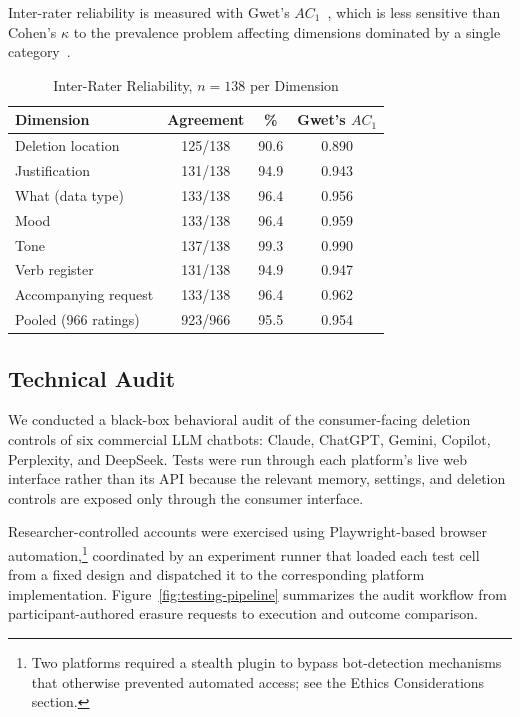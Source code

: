 \documentclass[conference,compsoc]{IEEEtran}
\begin{document}
Inter-rater reliability is measured with Gwet's $AC_1$~\cite{gwet2008ac1}, which is less sensitive than Cohen's $\kappa$ to the prevalence problem affecting dimensions dominated by a single category~\cite{gwet2008ac1,wongpakaran2013comparison}.

\begin{table}[t]
\centering
\caption{Inter-Rater Reliability, $n=138$ per Dimension}
\label{tab:ac1}
\small
\begin{tabular}{lccc}
\toprule
Dimension & Agreement & \% & Gwet's $AC_1$ \\
\midrule
Deletion location        & 125/138 & 90.6 & 0.890 \\
Justification            & 131/138 & 94.9 & 0.943 \\
What (data type)         & 133/138 & 96.4 & 0.956 \\
Mood                     & 133/138 & 96.4 & 0.959 \\
Tone                     & 137/138 & 99.3 & 0.990 \\
Verb register            & 131/138 & 94.9 & 0.947 \\
Accompanying request     & 133/138 & 96.4 & 0.962 \\
\midrule
Pooled (966 ratings) & 923/966 & 95.5 & 0.954 \\
\bottomrule
\end{tabular}
\end{table}

\subsection{Technical Audit}
\label{sec:audit-methodology}

We conducted a black-box behavioral audit of the consumer-facing deletion controls of six commercial LLM chatbots: Claude, ChatGPT, Gemini, Copilot, Perplexity, and DeepSeek. Tests were run through each platform's live web interface rather than its API because the relevant memory, settings, and deletion controls are exposed only through the consumer interface.

Researcher-controlled accounts were exercised using Playwright-based browser automation,\footnote{Two platforms required a stealth plugin to bypass bot-detection mechanisms that otherwise prevented automated access; see the Ethics Considerations section.} coordinated by an experiment runner that loaded each test cell from a fixed design and dispatched it to the corresponding platform implementation. Figure~\ref{fig:testing-pipeline} summarizes the audit workflow from participant-authored erasure requests to execution and outcome comparison.
\end{document}
